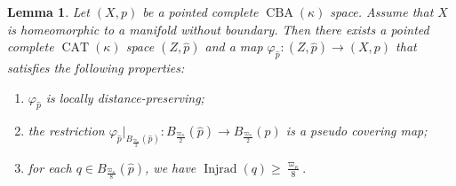 \documentclass[11pt,reqno]{amsart}
\newtheorem{lemma}[theorem]{Lemma}
\theoremstyle{definition}
\numberwithin{equation}{section}
\DeclareMathOperator{\CAT}{CAT}
\DeclareMathOperator{\CBA}{CBA}
\DeclareMathOperator{\Injrad}{Injrad}
\begin{document}
\begin{lemma}\label{lemextend}
Let $(X, p)$ be a pointed complete 
$\CBA(\kappa)$ space. Assume that $X$ is homeomorphic to a manifold without boundary. Then there exists a pointed complete $\CAT(\kappa)$ space $(Z, \hat{p})$ and  a map $\varphi_{\hat{p}}: (Z, \hat{p})  \to (X,p)$ 
that satisfies the following properties: 
\begin{enumerate}
	\item 
$\varphi_{\hat{p}}$ is
locally distance-preserving;  

	\item the restriction $\varphi_{\hat{p}}|_{B_{\frac{\varpi_{\kappa}}{2}} (\hat{p})}: B_{\frac{\varpi_{\kappa}}{2}} (\hat{p}) \to B_{\frac{\varpi_{\kappa}}{2}}(p)$ is a pseudo covering map; 
	\item for each $q\in B_{\frac{\varpi_{\kappa}}{8}}(\hat{p})$, we have 
$
\Injrad(q) \geq \frac{\varpi_{\kappa}}{8}.
$
\end{enumerate}
\end{lemma}
\end{document}
